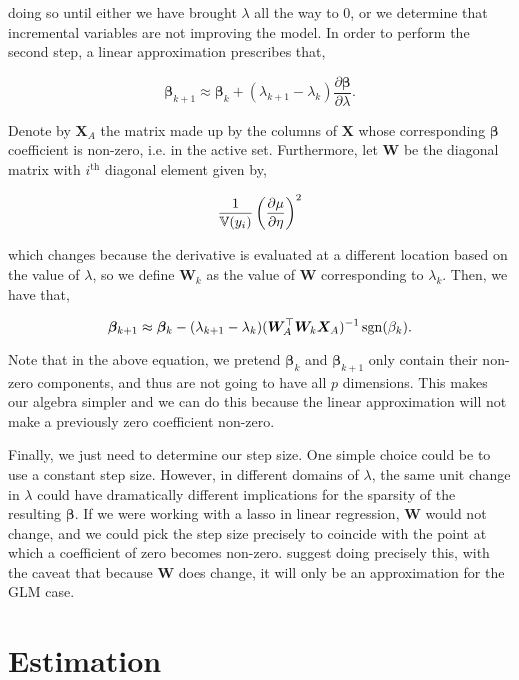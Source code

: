 \documentclass[letterpaper, 12pt]{article}
\newcommand{\bX}{\bm X}
\newcommand{\bW}{\bm W}
\newcommand{\bbeta}{\bm \beta}
\begin{document}
doing so until either we have brought $\lambda$ all the way to 0, or we
determine that incremental variables are not improving the model. In order to
perform the second step, a linear approximation prescribes that,

\[ \bbeta_{k+1} \approx \bbeta_k + (\lambda_{k+1} - \lambda_k) \frac{\partial
\bbeta}{\partial \lambda}.\]

Denote by $\bX_A$ the matrix made up by the columns of $\bX$ whose corresponding
$\bbeta$ coefficient is non-zero, i.e. in the active set. Furthermore, let $\bW$
be the diagonal matrix with $i^\text{th}$ diagonal element given by,

\[ \frac{1}{\mathbb{V}(y_i)} \left( \frac{\partial \mu}{\partial \eta} \right)^2\]

which changes because the derivative is evaluated at a different location based
on the value of $\lambda$, so we define $\bW_k$ as the value of $\bW$
corresponding to $\lambda_k$. Then, we have that,

\[ \bbeta_{k+1} \approx \bbeta_k - (\lambda_{k+1} - \lambda_k) (\bW_A^\top \bW_k
\bX_A)^{-1} \sgn (\beta_k).\]

Note that in the above equation, we pretend $\bbeta_k$ and $\bbeta_{k+1}$ only
contain their non-zero components, and thus are not going to have all $p$
dimensions. This makes our algebra simpler and we can do this because the linear
approximation will not make a previously zero coefficient non-zero.

Finally, we just need to determine our step size. One simple choice could be to
use a constant step size. However, in different domains of $\lambda$, the same
unit change in $\lambda$ could have dramatically different implications for the
sparsity of the resulting $\bbeta$. If we were working with a lasso in linear
regression, $\bW$ would not change, and we could pick the step size precisely to
coincide with the point at which a coefficient of zero becomes non-zero.
\cite{park2007l1} suggest doing precisely this, with the caveat that because
$\bW$ does change, it will only be an approximation for the GLM case. 


\section{Estimation}
\label{sec:estimation}
\end{document}
